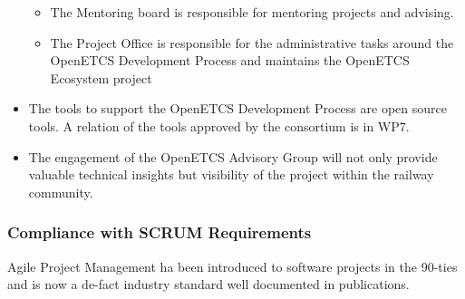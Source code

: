 \documentclass{template/openetcs_article}
\begin{document}
\begin{itemize}
\begin{itemize}
\item The Mentoring board is responsible for mentoring projects and advising.
\item The Project Office is responsible for the administrative tasks around the OpenETCS Development Process and maintains the OpenETCS Ecosystem project
\end{itemize}
\item The tools to support the OpenETCS Development Process are open source tools. A relation of the tools approved by the consortium is in WP7.
\item The engagement of the OpenETCS Advisory Group will not only provide valuable technical insights but visibility of the project within the railway community.
\end{itemize}

\subsubsection{Compliance with SCRUM Requirements}
Agile Project Management ha been introduced to software projects in the 90-ties and is now a de-fact industry standard well documented in publications.
\end{document}
